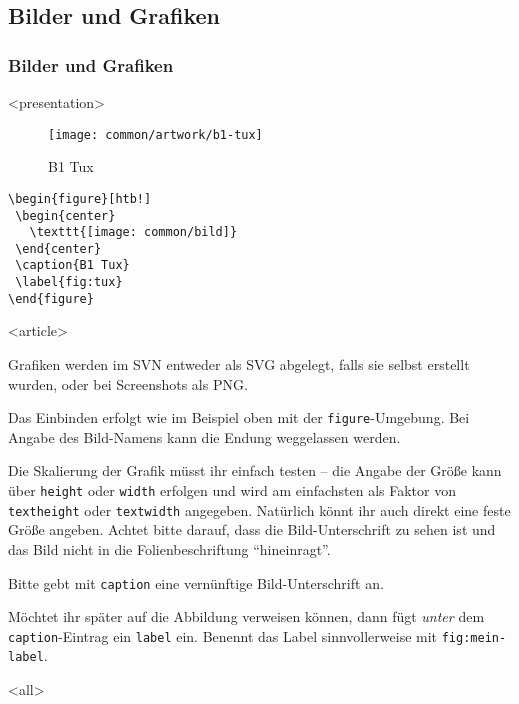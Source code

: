 \subsection{Bilder und Grafiken}
\begin{frame}[fragile]
\frametitle<presentation>{Bilder und Grafiken}


\mode
<presentation>
\begin{figure}[htb!]
        \begin{center}
        \texttt{[image: common/artwork/b1-tux]}
        \end{center}
        \caption{B1 Tux}
        \label{fig:tux}
\end{figure}
\begin{block}{}\small
\begin{verbatim}
\begin{figure}[htb!]
 \begin{center}
   \texttt{[image: common/bild]}
 \end{center}
 \caption{B1 Tux}
 \label{fig:tux}
\end{figure}
\end{verbatim}\normalsize\end{block}

\mode
<article>

Grafiken werden im SVN entweder als SVG abgelegt, falls sie selbst erstellt wurden, oder bei Screenshots als PNG.

Das Einbinden erfolgt wie im Beispiel oben mit der \texttt{figure}-Umgebung. Bei Angabe des Bild-Namens kann die Endung weggelassen werden.

Die Skalierung der Grafik müsst ihr einfach testen -- die Angabe der Größe kann über \texttt{height} oder \texttt{width} erfolgen und wird am einfachsten als Faktor von \texttt{textheight} oder \texttt{textwidth} angegeben. Natürlich könnt ihr auch direkt eine feste Größe angeben. Achtet bitte darauf, dass die Bild-Unterschrift zu sehen ist und das Bild nicht in die Folienbeschriftung "`hineinragt"'.

Bitte gebt mit \texttt{caption} eine vernünftige Bild-Unterschrift an.

Möchtet ihr später auf die Abbildung verweisen können, dann fügt \emph{unter} dem \texttt{caption}-Eintrag ein \texttt{label} ein. Benennt das Label sinnvollerweise mit \texttt{fig:mein-label}.

\mode
<all>

\end{frame}
\newpage

